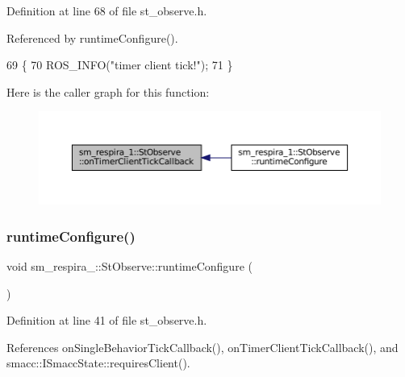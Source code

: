 Definition at line 68 of file st\+\_\+observe.\+h.



Referenced by runtime\+Configure().


\begin{DoxyCode}
69     \{
70         ROS\_INFO(\textcolor{stringliteral}{"timer client tick!"});
71     \}
\end{DoxyCode}
Here is the caller graph for this function\+:
\nopagebreak
\begin{figure}[H]
\begin{center}
\leavevmode
\includegraphics[width=350pt]{structsm__respira__1_1_1StObserve_a83c485ad4ae46796d84eb04ddabd97a2_icgraph}
\end{center}
\end{figure}
\mbox{\label{structsm__respira__1_1_1StObserve_a3c1fe027b9396233475e8bd94fed6df7}} 
\subsubsection{\texorpdfstring{runtime\+Configure()}{runtimeConfigure()}}
{\footnotesize\ttfamily void sm\+\_\+respira\+\_\+::\+St\+Observe\+::runtime\+Configure (\begin{DoxyParamCaption}{ }\end{DoxyParamCaption})\hspace{0.3cm}{\ttfamily [inline]}}



Definition at line 41 of file st\+\_\+observe.\+h.



References on\+Single\+Behavior\+Tick\+Callback(), on\+Timer\+Client\+Tick\+Callback(), and smacc\+::\+I\+Smacc\+State\+::requires\+Client().


